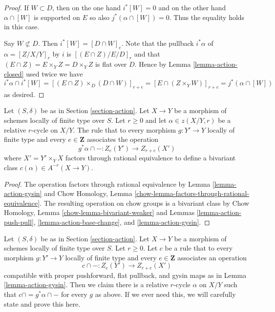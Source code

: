 \begin{proof}
\medskip\noindent
If $W \subset D$, then on the one hand $i^*[W] = 0$ and on the
other hand $\alpha \cap [W]$ is supported on $E$ so also
$j^*(\alpha \cap [W]) = 0$. Thus the equality holds in this case.

\medskip\noindent
Say $W \not \subset D$. Then $i^*[W] = [D \cap W]_e$.
Note that the pullback $i^*\alpha$ of $\alpha = [Z/X/Y]_r$
by $i$ is $[(E \cap Z)/E/D]_r$ and that
$(E \cap Z) = E \times_Y Z = D \times_Y Z$
is flat over $D$. Hence by Lemma \ref{lemma-action-closed}
used twice we have
$$
i^*\alpha \cap i^*[W] =
[(E \cap Z) \times_D (D \cap W)]_{r + e} =
[E \cap (Z \times_Y W)]_{r + e} =
j^*(\alpha \cap [W])
$$
as desired.
\end{proof}

\begin{proposition}
\label{proposition-get-bivariant-class}
Let $(S, \delta)$ be as in Section \ref{section-action}. Let $X \to Y$
be a morphism of schemes locally of finite type over $S$. Let $r \geq 0$
and let $\alpha \in z(X/Y, r)$ be a relative $r$-cycle on $X/Y$.
The rule that to every morphism $g : Y' \to Y$ locally of finite type
and every $e \in \mathbf{Z}$ associates the operation
$$
g^*\alpha \cap - : Z_e(Y') \to Z_{r + e}(X')
$$
where $X' = Y' \times_Y X$ factors through rational equivalence to
define a bivariant class $c(\alpha) \in A^{-r}(X \to Y)$.
\end{proposition}

\begin{proof}
The operation factors through rational equivalence by
Lemma \ref{lemma-action-gysin} and
Chow Homology, Lemma \ref{chow-lemma-factors-through-rational-equivalence}.
The resulting operation on chow groups is a bivariant class by
Chow Homology, Lemma \ref{chow-lemma-bivariant-weaker}
and
Lemmas \ref{lemma-action-push-pull}, \ref{lemma-action-base-change}, and
\ref{lemma-action-gysin}.
\end{proof}

\begin{remark}
\label{remark-characterize-relative-cycles}
Let $(S, \delta)$ be as in Section \ref{section-action}. Let $X \to Y$
be a morphism of schemes locally of finite type over $S$. Let $r \geq 0$.
Let $c$ be a rule that to every morphism $g : Y' \to Y$ locally of finite
type and every $e \in \mathbf{Z}$ associates an operation
$$
c \cap - : Z_e(Y') \to Z_{r + e}(X')
$$
compatible with proper pushforward, flat pullback, and gysin maps as in
Lemma \ref{lemma-action-gysin}. Then we claim there is a relative $r$-cycle
$\alpha$ on $X/Y$ such that $c \cap = g^*\alpha \cap -$ for every $g$ as above.
If we ever need this, we will carefully state and prove this here.
\end{remark}









